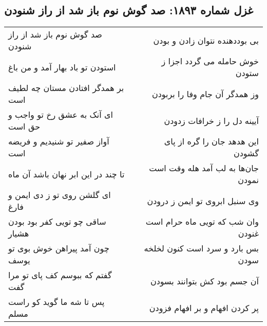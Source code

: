 \begin{center}
\section*{غزل شماره ۱۸۹۳: صد گوش نوم باز شد از راز شنودن}
\label{sec:1893}
\begin{longtable}{l p{0.5cm} r}
صد گوش نوم باز شد از راز شنودن
&&
بی بوددهنده نتوان زادن و بودن
\\
استودن تو باد بهار آمد و من باغ
&&
خوش حامله می گردد اجزا ز ستودن
\\
بر همدگر افتادن مستان چه لطیف است
&&
وز همدگر آن جام وفا را بربودن
\\
ای آنک به عشق رخ تو واجب و حق است
&&
آیینه دل را ز خرافات زدودن
\\
آواز صفیر تو شنیدیم و فریضه است
&&
این هدهد جان را گره از پای گشودن
\\
تا چند در این ابر نهان باشد آن ماه
&&
جان‌ها به لب آمد هله وقت است نمودن
\\
ای گلشن روی تو ز دی ایمن و فارغ
&&
وی سنبل ابروی تو ایمن ز درودن
\\
ساقی چو تویی کفر بود بودن هشیار
&&
وان شب که تویی ماه حرام است غنودن
\\
چون آمد پیراهن خوش بوی تو یوسف
&&
بس بارد و سرد است کنون لخلخه سودن
\\
گفتم که ببوسم کف پای تو مرا گفت
&&
آن جسم بود کش بتوانند بسودن
\\
پس تا شه ما گوید کو راست مسلم
&&
پر کردن افهام و بر افهام فزودن
\\
\end{longtable}
\end{center}
